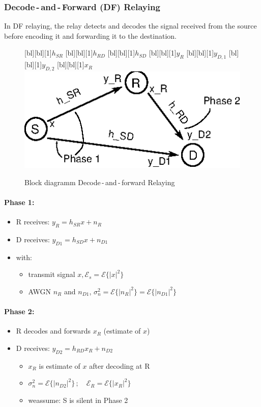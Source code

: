 \documentclass[a4paper, 10pt]{article}
\begin{document}
\subsubsection{Decode\,-\,and\,-\,Forward (DF) Relaying}
In DF relaying, the relay detects and decodes the signal received from the source before encoding it and  forwarding it to the destination.
	\begin{figure}[ht]
		\centering
		[bl][bl][1]{$h_{SR}$}
		[bl][bl][1]{$h_{RD}$}
		[bl][bl][1]{$h_{SD}$}
		[bl][bl][1]{$y_R$}
		[bl][bl][1]{$y_{D,1}$}
		[bl][bl][1]{$y_{D,2}$}
		[bl][bl][1]{$x_R$}		
		\includegraphics[scale=1.5]{DF_Relaying}	
		\caption{Block diagramm Decode\,-\,and\,-\,forward Relaying}
		\label{fig:df_relaying}
	\end{figure}
\paragraph{Phase 1:}
\begin{itemize}
	\item R receives: $ y_R = h_{SR}x + n_R $
	\item D receives: $ y_{D1} = h_{SD}x + n_{D1} $
	\item with: 
	\begin{itemize}
		\item transmit signal $x, \mathcal{E}_s = \mathcal{E}\{|x|^2\} $
		\item AWGN $n_R $ and $ n_{D1}$, $\sigma_n^2 = \mathcal{E}\{|n_R|^2\} = \mathcal{E}\{|n_{D1}|^2\} $
	\end{itemize}
\end{itemize}
\paragraph{Phase 2:}
\begin{itemize}
	\item R decodes and forwards $x_R$ (estimate of $x$)
	\item D receives: $ y_{D2} = h_{RD}x_R + n_{D2} $
	\begin{itemize}
		\item $x_R$ is estimate of $x $ after decoding at R
		\item $\sigma_n^2 = \mathcal{E}\{|n_{D2}|^2\}\,;\quad \mathcal{E}_R = \mathcal{E}\{|x_R|^2\} $
		\item weassume: S is silent in Phase 2		 
	\end{itemize}
\end{itemize}
\end{document}

